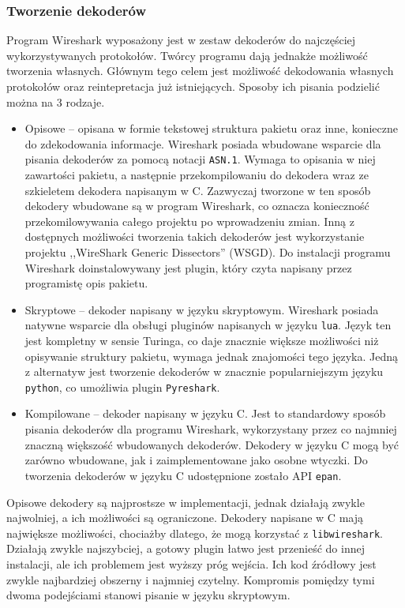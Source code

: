 \documentclass[a4paper, 12pt, twoside, openright]{article}
\begin{document}
	\subsubsection{Tworzenie dekoderów}
	\indent\par
	Program Wireshark wyposażony jest w zestaw dekoderów do najczęściej wykorzystywanych protokołów. Twórcy programu
	dają jednakże możliwość tworzenia własnych. Głównym tego celem jest możliwość
	dekodowania własnych protokołów oraz reintepretacja już istniejących. Sposoby ich pisania podzielić można na 3 rodzaje.
	\begin{itemize}
		\item Opisowe -- opisana w formie tekstowej struktura pakietu oraz inne, konieczne do zdekodowania informacje.
			Wireshark posiada wbudowane wsparcie dla pisania dekoderów za pomocą notacji \texttt{ASN.1}. Wymaga to opisania
			w niej zawartości pakietu, a następnie przekompilowaniu do dekodera wraz ze szkieletem dekodera napisanym w C.
			Zazwyczaj tworzone w ten sposób dekodery wbudowane są w program Wireshark, co oznacza konieczność przekomilowywania
			całego projektu po wprowadzeniu zmian.
			Inną z dostępnych możliwości tworzenia takich dekoderów jest wykorzystanie projektu ,,WireShark Generic Dissectors'' (WSGD).
			Do instalacji programu Wireshark doinstalowywany jest plugin, który czyta napisany przez programistę opis pakietu.
		\item Skryptowe -- dekoder napisany w języku skryptowym. Wireshark posiada natywne wsparcie dla obsługi pluginów
			napisanych w języku \texttt{lua}. Język ten jest kompletny w sensie Turinga, co daje znacznie większe możliwości
			niż opisywanie struktury pakietu, wymaga jednak znajomości tego języka. Jedną z alternatyw jest tworzenie
			dekoderów w znacznie popularniejszym języku \texttt{python}, co umożliwia plugin \texttt{Pyreshark}.
		\item Kompilowane -- dekoder napisany w języku C. Jest to standardowy sposób pisania dekoderów dla programu Wireshark,
			wykorzystany przez co najmniej znaczną większość wbudowanych dekoderów. Dekodery w języku C mogą być zarówno wbudowane,
			jak i zaimplementowane jako osobne wtyczki. Do tworzenia dekoderów w języku C udostępnione zostało API \texttt{epan}.
	\end{itemize}

	Opisowe dekodery są najprostsze w implementacji, jednak działają zwykle najwolniej, a ich możliwości są ograniczone.
	Dekodery napisane w C mają największe możliwości, chociażby dlatego, że mogą korzystać z \texttt{libwireshark}. Działają zwykle
	najszybciej, a gotowy plugin łatwo jest przenieść do innej instalacji, ale ich problemem jest wyższy próg wejścia.
	Ich kod źródłowy jest zwykle najbardziej obszerny i najmniej czytelny. Kompromis pomiędzy tymi dwoma podejściami
	stanowi pisanie w języku skryptowym.
\end{document}
